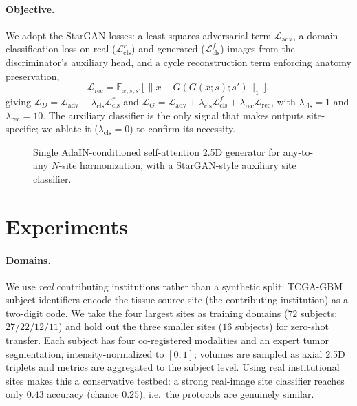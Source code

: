 \documentclass[runningheads]{llncs}
\begin{document}
\paragraph{Objective.}
We adopt the StarGAN losses: a least-squares adversarial term
$\mathcal{L}_{\mathrm{adv}}$, a domain-classification loss on real
($\mathcal{L}_{\mathrm{cls}}^{r}$) and generated ($\mathcal{L}_{\mathrm{cls}}^{f}$)
images from the discriminator's auxiliary head, and a cycle reconstruction term
enforcing anatomy preservation,
\begin{equation}
  \mathcal{L}_{\mathrm{rec}} = \mathbb{E}_{x,s,s'}\big[\,\|x - G(G(x;s);s')\|_1\,\big],
  \label{eq:rec}
\end{equation}
giving $\mathcal{L}_D = \mathcal{L}_{\mathrm{adv}} + \lambda_{\mathrm{cls}}\mathcal{L}_{\mathrm{cls}}^{r}$
and $\mathcal{L}_G = \mathcal{L}_{\mathrm{adv}} + \lambda_{\mathrm{cls}}\mathcal{L}_{\mathrm{cls}}^{f}
+ \lambda_{\mathrm{rec}}\mathcal{L}_{\mathrm{rec}}$, with
$\lambda_{\mathrm{cls}}{=}1$ and $\lambda_{\mathrm{rec}}{=}10$. The auxiliary
classifier is the only signal that makes outputs site-specific; we ablate it
($\lambda_{\mathrm{cls}}{=}0$) to confirm its necessity.

\begin{figure}[t]
  \centering
  \caption{Single AdaIN-conditioned self-attention 2.5D generator for any-to-any
  $N$-site harmonization, with a StarGAN-style auxiliary site classifier.}
  \label{fig:method}
\end{figure}

\section{Experiments}
\label{sec:exp}
\paragraph{Domains.}
We use \emph{real} contributing institutions rather than a synthetic split:
TCGA-GBM subject identifiers encode the tissue-source site (the contributing
institution) as a two-digit code. We take the four largest sites as training
domains ($72$ subjects: $27/22/12/11$) and hold out the three smaller sites
($16$ subjects) for zero-shot transfer. Each subject has four co-registered
modalities and an expert tumor segmentation, intensity-normalized to $[0,1]$;
volumes are sampled as axial 2.5D triplets and metrics are aggregated to the
subject level. Using real institutional sites makes this a conservative testbed:
a strong real-image site classifier reaches only $0.43$ accuracy (chance $0.25$),
i.e.\ the protocols are genuinely similar.
\end{document}
